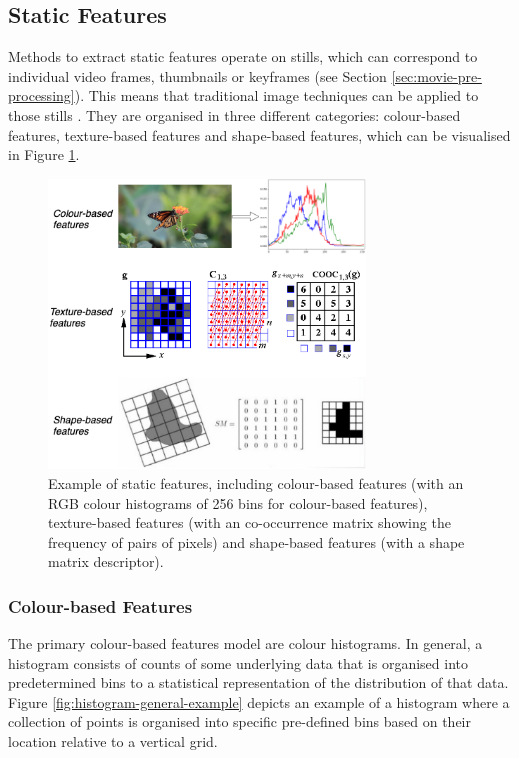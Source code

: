 
\subsection{Static Features}
\label{sec:litsurvey-static-features}

Methods to extract static features operate on stills, which can correspond to individual video frames, thumbnails or keyframes (see Section \ref{sec:movie-pre-processing}). This means that traditional image techniques can be applied to those stills \cite{hu2011survey}. They are organised in three different categories: colour-based features, texture-based features and shape-based features, which can be visualised in Figure \ref{fig:colour-texture-shape-features}.

\begin{figure}[h]
\centerline{\includegraphics[width=0.75\textwidth]{figures/litsurvey/colour-texture-shape-features.png}}
\caption{\label{fig:colour-texture-shape-features}Example of static features, including colour-based features (with an RGB colour histograms of 256 bins for colour-based features), texture-based features (with an co-occurrence matrix showing the frequency of pairs of pixels) and shape-based features (with a shape matrix descriptor).}
\end{figure}

\subsubsection{Colour-based Features}
\label{sec:color-based-features}

The primary colour-based features model are colour histograms. In general, a histogram consists of counts of some underlying data that is organised into predetermined bins to a statistical representation of the distribution of that data. Figure \ref{fig:histogram-general-example} depicts an example of a histogram where a collection of points is organised into specific pre-defined bins based on their location relative to a vertical grid.

